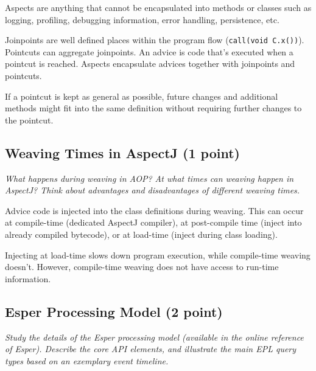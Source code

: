 \documentclass[a4paper,10pt]{article}
\begin{document}
\vspace{3mm}

Aspects are anything that cannot be encapsulated into methods or classes such as logging, profiling,
debugging information, error handling, persistence, etc.

Joinpoints are well defined places within the program flow (\lstinline|call(void C.x())|).
Pointcuts can aggregate joinpoints. An advice is code that's executed when a pointcut is reached.
Aspects encapsulate advices together with joinpoints and pointcuts.

If a pointcut is kept as general as possible, future changes and additional methods
might fit into the same definition without requiring further changes to the pointcut.

\subsection{Weaving Times in AspectJ (1 point)}

\emph{What happens during weaving in AOP? At what times can weaving happen in AspectJ? Think about
advantages and disadvantages of different weaving times.}

\vspace{3mm}

Advice code is injected into the class definitions during weaving. This can
occur at compile-time (dedicated AspectJ compiler), at post-compile time
(inject into already compiled bytecode), or at load-time (inject during class
loading).

Injecting at load-time slows down program execution, while compile-time weaving
doesn't. However, compile-time weaving does not have access to run-time information.

\subsection{Esper Processing Model (2 point)}

\emph{Study the details of the Esper processing model (available in the online reference of Esper). Describe the
core API elements, and illustrate the main EPL query types based on an exemplary event timeline.}

\begin{comment}
Use the Esper reference to get familiar with some of the additional core
concepts (e.g., contexts). During the interview sessions you should be prepared
to report on your experiences with CEP and the strengths/weaknesses of Esper.
Also, think about the core differences of the Esper processing model as opposed
to querying a standard database like MySQL.
\end{comment}
\end{document}

